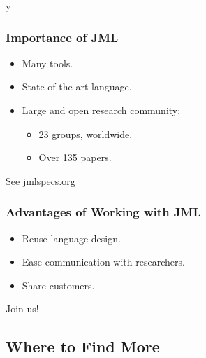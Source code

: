 \if y\MAKEHANDOUTS \documentclass[compress,landscape,handout]{beamer}
\begin{document}
\begin{frame}
\frametitle{Importance of JML}

\begin{itemize}
\item
Many tools.

\item
State of the art language.

\item
Large and open research community:
\begin{itemize}
\item
23 groups, worldwide.

\item
Over 135 papers.
\end{itemize}
\end{itemize}

See \href{http://www.jmlspecs.org}{jmlspecs.org}
\end{frame}

\begin{frame}
\frametitle{Advantages of Working with JML}

\begin{itemize}
\item
Reuse language design.

\item
Ease communication with researchers.

\item
Share customers.
\end{itemize}

Join us!
\end{frame}

\subsection[Finding More]{Where to Find More}
\end{document}
